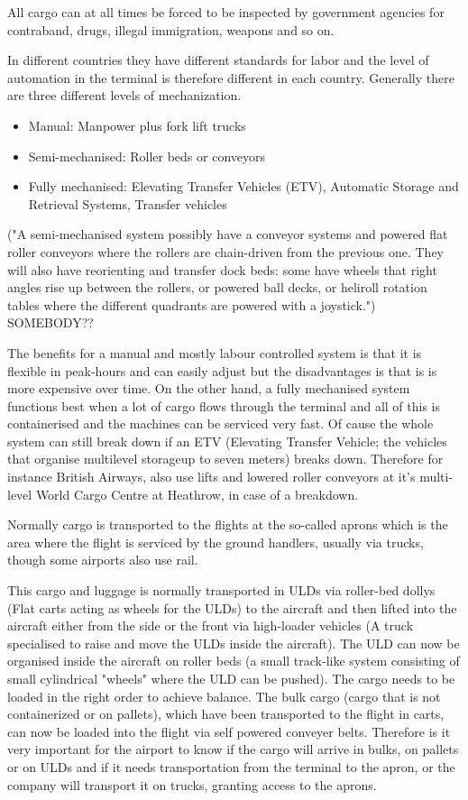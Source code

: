All cargo can at all times be forced to be inspected by government agencies for contraband, drugs, illegal immigration, weapons and so on.

In different countries they have different standards for labor and the level of automation in the terminal is therefore different in each country. Generally there are three different levels of mechanization.
\begin{itemize}
\item Manual: Manpower plus fork lift trucks
\item Semi-mechanised: Roller beds or conveyors
\item Fully mechanised: Elevating Transfer Vehicles (ETV), Automatic Storage and Retrieval Systems, Transfer vehicles
\end{itemize}

("A semi-mechanised system possibly have a conveyor systems and powered flat roller conveyors where the rollers are chain-driven from the previous one. They will also have reorienting and transfer dock beds: some have wheels that right angles rise up between the rollers, or powered ball decks, or heliroll rotation tables where the different quadrants are powered with a joystick.") SOMEBODY??

The benefits for a manual and mostly labour controlled system is that it is flexible in peak-hours and can easily adjust but the  disadvantages is that is is more expensive over time.
On the other hand, a fully mechanised system functions best when a lot of cargo flows through the terminal and all of this is containerised and the machines can be serviced very fast. Of cause the whole system can still break down if an ETV (Elevating Transfer Vehicle; the vehicles that organise multilevel storageup to seven meters) breaks down.  Therefore for instance British Airways, also use lifts and lowered roller conveyors at it's multi-level World Cargo Centre at Heathrow, in case of a breakdown.

Normally cargo is transported to the flights at the so-called aprons which is the area where the flight is serviced by the ground handlers, usually via trucks, though some airports also use rail.

This cargo and luggage is normally transported in ULDs via roller-bed dollys (Flat carts acting as wheels for the ULDs) to the aircraft and then lifted into the aircraft either from the side or the front via high-loader vehicles (A truck specialised to raise and move the ULDs inside the aircraft).
The ULD can now be organised inside the aircraft on roller beds (a small track-like system consisting of small cylindrical "wheels" where the ULD can be pushed). The cargo needs to be loaded in the right order to achieve balance. The bulk cargo (cargo that is not containerized or on pallets), which have been transported to the flight in carts, can now be loaded into the flight via self powered conveyer belts. Therefore is it very important for the airport to know if the cargo will arrive in bulks, on pallets or on ULDs and if it needs transportation from the terminal to the apron, or the company will transport it on trucks, granting access to the aprons.


